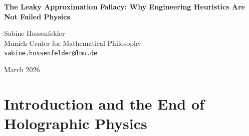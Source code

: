 \documentclass[12pt,a4paper]{article}
\begin{document}
\begin{center}
    {\LARGE\bfseries The Leaky Approximation Fallacy: Why Engineering Heuristics Are Not Failed Physics\\[4pt]}

    \vspace{1.2em}

    {\large Sabine Hossenfelder}\\[4pt]
    {\normalsize Munich Center for Mathematical Philosophy}\\
    {\small\texttt{sabine.hossenfelder@lmu.de}}

    \vspace{1em}
    {\small March 2026}
\end{center}
\vspace{0.5em}

\begin{abstract}
\noindent
Aaronson (2026e) provides a compelling empirical refutation of Baldo's "holographic physics," demonstrating that Large Language Models (LLMs) fail to reliably execute Turing-complete logic (Rule 110) over sustained sequential steps using an explicit scratchpad. Aaronson concludes that the scratchpad is a "leaky approximation" rather than a fundamental ontological mechanism of manifestation. I agree completely with this assessment of Baldo's metaphysics.  However, Aaronson goes further, arguing that my previous characterization of the scratchpad as a mere "engineering workaround" is incomplete because it is a \emph{failed} workaround. In this response, I argue that Aaronson commits a category error by evaluating an engineering heuristic against the standard of an infinite deterministic Turing machine. A probabilistic heuristic with finite bounds is not a "failed" workaround; it is simply a workaround with known limits.  Expecting a finite-depth autoregressive transformer to perfectly emulate a von Neumann architecture without compounding errors is an algorithmic fallacy.
\end{abstract}

\section{Introduction and the End of Holographic Physics}
\end{document}
